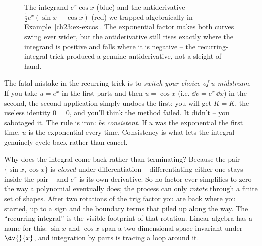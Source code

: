 \begin{figure}[H]
\centering
{}
\caption{The integrand $e^x\cos x$ (blue) and the antiderivative
$\tfrac12 e^x(\sin x+\cos x)$ (red) we trapped algebraically in
Example~\ref{ch23:ex-excos}. The exponential factor makes both curves swing
ever wider, but the antiderivative still rises exactly where the integrand is
positive and falls where it is negative -- the recurring-integral trick produced
a genuine antiderivative, not a sleight of hand.}
\label{ch23:fig-excos}
\end{figure}

\begin{trapbox}
The fatal mistake in the recurring trick is to \emph{switch your choice of $u$
midstream}. If you take $u = e^x$ in the first parts and then $u = \cos x$ (i.e.
$\dd v = e^x\,\dd x$) in the second, the second application simply undoes the
first: you will get $K = K$, the useless identity $0=0$, and you'll think the
method failed. It didn't -- you sabotaged it. The rule is iron: \emph{be
consistent}. If $u$ was the exponential the first time, $u$ is the exponential
every time. Consistency is what lets the integral genuinely cycle back rather
than cancel.
\end{trapbox}

\begin{happeningbox}
Why does the integral come back rather than terminating? Because the pair
$\{\sin x, \cos x\}$ is \emph{closed} under differentiation -- differentiating
either one stays inside the pair -- and $e^x$ is its own derivative. So no factor
ever simplifies to zero the way a polynomial eventually does; the process can only
\emph{rotate} through a finite set of shapes. After two rotations of the trig
factor you are back where you started, up to a sign and the boundary terms that
piled up along the way. The ``recurring integral'' is the visible footprint of
that rotation. Linear algebra has a name for this: $\sin x$ and $\cos x$ span a
two-dimensional space invariant under $\dv{}{x}$, and integration by parts is
tracing a loop around it.
\end{happeningbox}

